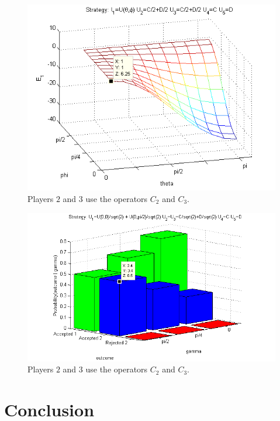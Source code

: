 \documentclass[10pt,twocolumn]{llncs}
\begin{document}
\begin{figure}[h!]
\centering 
\includegraphics[scale=0.80]{Figures/1.5qubit/mixedclassical.png}
\caption{Players $2$ and $3$ use the operators $C_{2}$ and $C_{3}$. }
\label{fig:pg_3players_99_0_1:2}
\end{figure}

\begin{figure}[h!]
\centering 
\includegraphics[scale=0.80]{Figures/1.5qubit/mixedmixedclassical.png}
\caption{Players $2$ and $3$ use the operators $C_{2}$ and $C_{3}$. }
\label{fig:pg_3players_99_0_1:2}
\end{figure}






\section{Conclusion}
\end{document}
